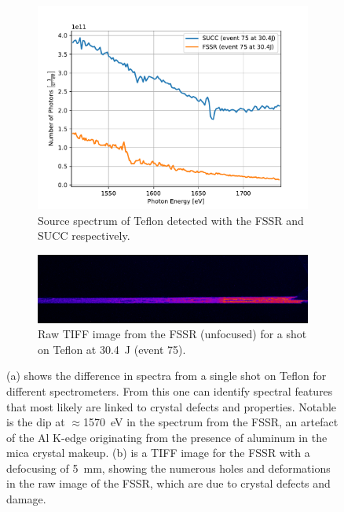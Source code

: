 \begin{figure} [H]
	\centering
	\begin{subfigure}[t]{0.7\textwidth}
		\centering
		\includegraphics[width=\textwidth]{Data_Analysis/basic_spectra/spectra_of_PTFE_events_75_75.pdf}
		\caption{Source spectrum of Teflon detected with the FSSR and SUCC respectively.}
		\label{fig: FSSR basic spectrum}
	\end{subfigure}
	\hfill
	\begin{subfigure}[t]{\textwidth}
		\centering
		\includegraphics[width=\textwidth]{Data_Analysis/basic_spectra/FSSR_75.png}
		\caption{Raw TIFF image from the FSSR (unfocused) for a shot on Teflon at \SI{30.4}{\joule} (event 75).}
		\label{fig: FSSR TIFF}
	\end{subfigure}
	\caption{(a) shows the difference in spectra from a single shot on Teflon for different spectrometers. From this one can identify spectral features that most likely are linked to crystal defects and properties. Notable is the dip at $\approx$\SI{1570}{\electronvolt} in the spectrum from the FSSR, an artefact of the Al K-edge originating from the presence of aluminum in the mica crystal makeup. (b) is a TIFF image for the FSSR with a defocusing of \SI{5}{\milli\meter}, showing the numerous holes and deformations in the raw image of the FSSR, which are due to crystal defects and damage.}
	\label{}
\end{figure}

